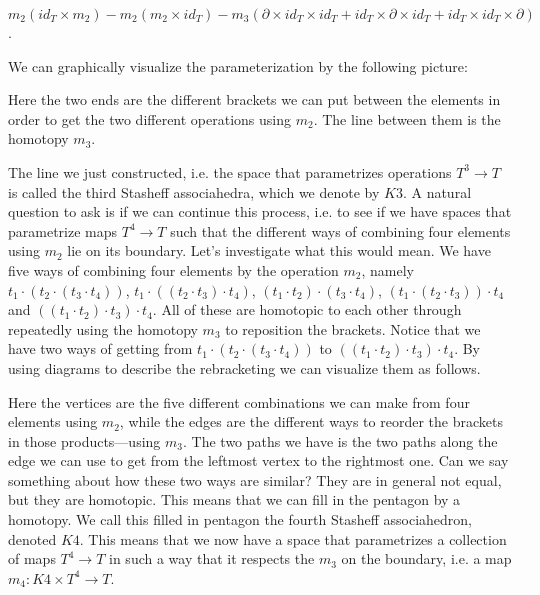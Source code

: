 $ m_2(id_T\times m_2) - m_2(m_2 \times id_T) - m_3(\partial \times id_T \times id_T + id_T\times \partial \times id_T + id_T\times id_T\times \partial )$.

We can graphically visualize the parameterization by the following picture:

\begin{center}
\def\svgwidth{0.6\textwidth}

\end{center}


Here the two ends are the different brackets we can put between the elements in order to get the two different operations using $ m_2$. The line between them is the homotopy $m_3$.

The line we just constructed, i.e. the space that parametrizes operations $ T^3\longrightarrow T$ is called the third Stasheff associahedra, which we denote by $K3$. A natural question to ask is if we can continue this process, i.e. to see if we have spaces that parametrize maps $T^4\longrightarrow T$ such that the different ways of combining four elements using $m_2$ lie on its boundary. Let's investigate what this would mean. We have five ways of combining four elements by the operation $ m_2$, namely $ t_1 \cdot (t_2 \cdot (t_3 \cdot t_4))$, $ t_1 \cdot ((t_2 \cdot t_3) \cdot t_4)$, $ (t_1 \cdot t_2) \cdot (t_3 \cdot t_4)$, $ (t_1 \cdot (t_2 \cdot t_3)) \cdot t_4$ and $ ((t_1 \cdot t_2) \cdot t_3) \cdot t_4$. All of these are homotopic to each other through repeatedly using the homotopy $m_3$ to reposition the brackets. Notice that we have two ways of getting from $ t_1 \cdot (t_2 \cdot (t_3 \cdot t_4))$ to $ ((t_1 \cdot t_2) \cdot t_3) \cdot t_4$. By using diagrams to describe the rebracketing we can visualize them as follows.

\begin{center}
\def\svgwidth{0.6\textwidth}

\end{center}

Here the vertices are the five different combinations we can make from four elements using $m_2$, while the edges are the different ways to reorder the brackets in those products---using $m_3$. The two paths we have is the two paths along the edge we can use to get from the leftmost vertex to the rightmost one. Can we say something about how these two ways are similar? They are in general not equal, but they are homotopic. This means that we can fill in the pentagon by a homotopy. We call this filled in pentagon the fourth Stasheff associahedron, denoted $K4$. This means that we now have a space that parametrizes a collection of maps $T^4\longrightarrow T$ in such a way that it respects the $ m_3$ on the boundary, i.e. a map $m_4: K4\times T^4\longrightarrow T$.

